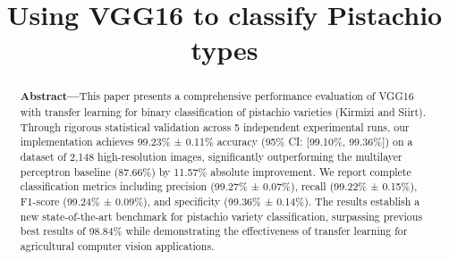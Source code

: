 \documentclass[conference]{IEEEtran}
\begin{document}
\title{Using VGG16 to classify Pistachio types\\

}

\author{
\and
{}
\and
{}
\and
{}

}

\maketitle

\begin{abstract}
\textbf{Abstract—}This paper presents a comprehensive performance evaluation of VGG16 with transfer learning for binary classification of pistachio varieties (Kirmizi and Siirt). Through rigorous statistical validation across 5 independent experimental runs, our implementation achieves 99.23\% ± 0.11\% accuracy (95\% CI: [99.10\%, 99.36\%]) on a dataset of 2,148 high-resolution images, significantly outperforming the multilayer perceptron baseline (87.66\%) by 11.57\% absolute improvement. We report complete classification metrics including precision (99.27\% ± 0.07\%), recall (99.22\% ± 0.15\%), F1-score (99.24\% ± 0.09\%), and specificity (99.36\% ± 0.14\%). The results establish a new state-of-the-art benchmark for pistachio variety classification, surpassing previous best results of 98.84\% while demonstrating the effectiveness of transfer learning for agricultural computer vision applications.
\end{abstract}
\end{document}
